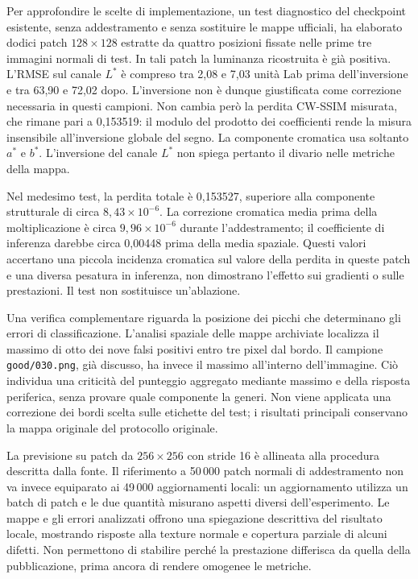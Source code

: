 Per approfondire le scelte di implementazione, un test diagnostico del checkpoint esistente, senza addestramento e senza sostituire le mappe ufficiali, ha elaborato dodici patch $128\times128$ estratte da quattro posizioni fissate nelle prime tre immagini normali di test. In tali patch la luminanza ricostruita è già positiva. L'RMSE sul canale $L^*$ è compreso tra 2,08 e 7,03 unità Lab prima dell'inversione e tra 63,90 e 72,02 dopo. L'inversione non è dunque giustificata come correzione necessaria in questi campioni. Non cambia però la perdita CW-SSIM misurata, che rimane pari a 0,153519: il modulo del prodotto dei coefficienti rende la misura insensibile all'inversione globale del segno. La componente cromatica usa soltanto $a^*$ e $b^*$. L'inversione del canale $L^*$ non spiega pertanto il divario nelle metriche della mappa.

Nel medesimo test, la perdita totale è 0,153527, superiore alla componente strutturale di circa $8{,}43\times10^{-6}$. La correzione cromatica media prima della moltiplicazione è circa $9{,}96\times10^{-6}$ durante l'addestramento; il coefficiente di inferenza darebbe circa 0,00448 prima della media spaziale. Questi valori accertano una piccola incidenza cromatica sul valore della perdita in queste patch e una diversa pesatura in inferenza, non dimostrano l'effetto sui gradienti o sulle prestazioni. Il test non sostituisce un'ablazione.

Una verifica complementare riguarda la posizione dei picchi che determinano gli errori di classificazione. L’analisi spaziale delle mappe archiviate localizza il massimo di otto dei nove falsi positivi entro tre pixel dal bordo. Il campione \texttt{good/030.png}, già discusso, ha invece il massimo all'interno dell'immagine. Ciò individua una criticità del punteggio aggregato mediante massimo e della risposta periferica, senza provare quale componente la generi. Non viene applicata una correzione dei bordi scelta sulle etichette del test; i risultati principali conservano la mappa originale del protocollo originale.

La previsione su patch da $256\times256$ con stride 16 è allineata alla procedura descritta dalla fonte. Il riferimento a 50\,000 patch normali di addestramento non va invece equiparato ai 49\,000 aggiornamenti locali: un aggiornamento utilizza un batch di patch e le due quantità misurano aspetti diversi dell'esperimento. Le mappe e gli errori analizzati offrono una spiegazione descrittiva del risultato locale, mostrando risposte alla texture normale e copertura parziale di alcuni difetti. Non permettono di stabilire perché la prestazione differisca da quella della pubblicazione, prima ancora di rendere omogenee le metriche.

